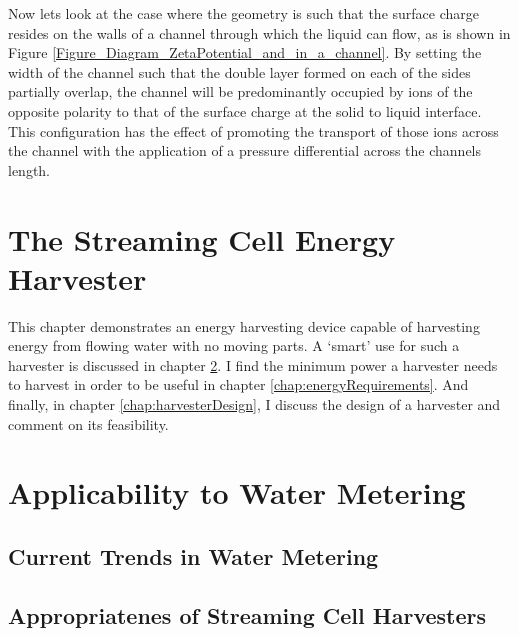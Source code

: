     Now lets look at the case where the geometry is such that the surface charge
    resides on the walls of a channel through which the liquid can flow, as is
    shown in Figure \ref{Figure_Diagram_ZetaPotential_and_in_a_channel}.  By
    setting the width of the channel such that the double layer formed on each of
    the sides partially overlap, the channel will be predominantly occupied by ions
    of the opposite polarity to that of the surface charge at the solid to liquid
    interface. This configuration has the effect of promoting the transport of
    those ions across the channel with the application of a pressure differential
    across the channels length.


\chapter{The Streaming Cell Energy Harvester}
  \label{chap:harvestingEnergy}

  This chapter demonstrates an energy harvesting device capable of harvesting energy from flowing water with no moving parts.
  A `smart' use for such a harvester is discussed in chapter \ref{chap:wirelessWaterMetering}.
  I find the minimum power a harvester needs to harvest in order to be useful in chapter \ref{chap:energyRequirements}.
  And finally, in chapter \ref{chap:harvesterDesign}, I discuss the design of a harvester and comment on its feasibility.

  

\chapter{Applicability to Water Metering}
  \label{chap:wirelessWaterMetering}
  \section{Current Trends in Water Metering}
  \section{Appropriatenes of Streaming Cell Harvesters}

